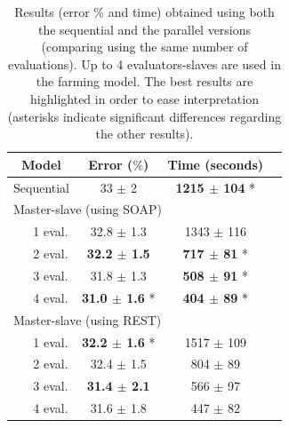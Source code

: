 \documentclass[final,1p,times]{elsarticle}
\begin{document}
\begin{table}[!h]
\small{
\begin{tabular}{|c|c|c|c|}
\hline 
Model         &  Error ($\%$)  &  Time (seconds)  \\
\hline
\hline
Sequential    &   33 $\pm$ 2   &   \textbf{1215 $\pm$ 104} *  \\    
\hline
\hline
\multicolumn{3}{|l|}{Master-slave (using SOAP)} \\
\hline
\ \ \ 1 eval. &   32.8 $\pm$ 1.3   &    1343 $\pm$ 116  \\
\hline
\ \ \ 2 eval. &   \textbf{32.2 $\pm$ 1.5}   &    \textbf{717 $\pm$ 81} *  \\
\hline
\ \ \ 3 eval. &   31.8 $\pm$ 1.3   &    \textbf{508 $\pm$ 91} *  \\
\hline
\ \ \ 4 eval. &   \textbf{31.0 $\pm$ 1.6} * &    \textbf{404 $\pm$ 89} *  \\
\hline
\hline
\multicolumn{3}{|l|}{Master-slave (using REST)} \\
\hline
\ \ \ 1 eval. &   \textbf{32.2 $\pm$ 1.6} * &    1517 $\pm$ 109  \\
\hline
\ \ \ 2 eval. &   32.4 $\pm$ 1.5   &    804 $\pm$ 89   \\
\hline
\ \ \ 3 eval. &   \textbf{31.4 $\pm$ 2.1}   &    566 $\pm$ 97   \\
\hline
\ \ \ 4 eval. &   31.6 $\pm$ 1.8   &    447 $\pm$ 82   \\
\hline
\hline
\end{tabular}
}
\caption{Results (error $\%$ and time) obtained using both the sequential and the parallel versions (comparing using the same number of evaluations). Up to 4 evaluators-slaves are used in the farming model. The best results are highlighted in order to ease interpretation (asterisks indicate significant differences regarding the other results). 
\label{tabla:resultados3} }
\end{table}
\end{document}
